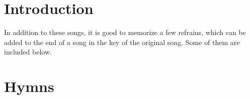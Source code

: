 \section{Introduction}

In addition to these songs, it is good to memorize a few refrains, which can be added to the end of a song in the key of the original song. Some of them are included below.


\section{Hymns}

